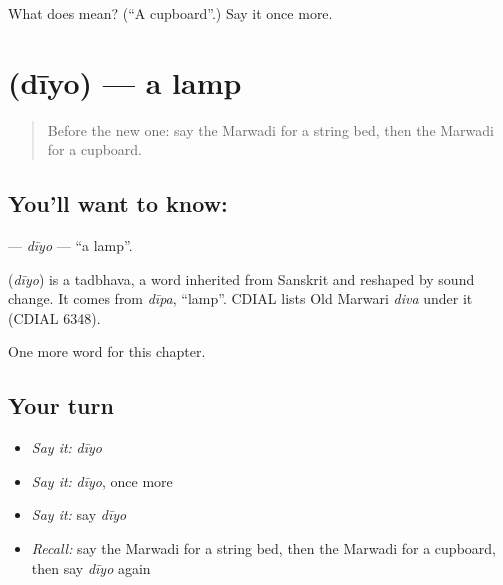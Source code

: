 \begin{tcolorbox}[breakable,colback=teal!4,colframe=teal!35!black,title={Before you move on}]
What does  mean? (\textquotedblleft{}A cupboard\textquotedblright{}.) Say it once more.
\end{tcolorbox}
\section[\texorpdfstring{\mw{दीयो} (dīyo)}{दीयो (dīyo)}]{ (dīyo) — a lamp}

\label{lesson:MW-C63-diyo}



\begin{quote}
Before the new one: say the Marwadi for a string bed, then the Marwadi for a cupboard.
\end{quote}

\subsection*{You'll want to know: }
\textbf{} — \emph{dīyo} — \textquotedblleft{}a lamp\textquotedblright{}.

\begin{cousinweb}
\textbf{} (\emph{dīyo}) is a tadbhava, a word inherited from Sanskrit and reshaped by sound change. It comes from \emph{dīpa}, \textquotedblleft{}lamp\textquotedblright{}. CDIAL lists Old Marwari \emph{diva} under it (CDIAL 6348).
\end{cousinweb}

\begin{grammarlens}[title={What you've built}]
One more word for this chapter.
\end{grammarlens}

\subsection*{Your turn}
\begin{itemize}
\raggedright
  \item \emph{Say it:} \emph{dīyo}
  \item \emph{Say it:} \emph{dīyo}, once more
  \item \emph{Say it:} say \emph{dīyo}
  \item \emph{Recall:} say the Marwadi for a string bed, then the Marwadi for a cupboard, then say \emph{dīyo} again
\end{itemize}

